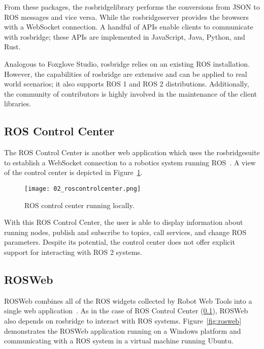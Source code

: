         From these packages, the \textsf{rosbridge\smallunderscore library} performs the conversions from \ac{JSON} to \ac{ROS} messages and vice versa. While the \textsf{rosbridge\smallunderscore server} provides the browsers with a WebSocket connection. A handful of \ac{API}s enable clients to communicate with \textsf{rosbridge}; these \ac{API}s are implemented in JavaScript, Java, Python, and Rust.

        Analogous to Foxglove Studio, \textsf{rosbridge} relies on an existing ROS installation. However, the capabilities of \textsf{rosbridge} are extensive and can be applied to real world scenarios; it also supports \ac{ROS} 1 and \ac{ROS} 2 distributions. Additionally, the community of contributors is highly involved in the maintenance of the client libraries.

    \subsection{ROS Control Center}\label{sec:roscontrolcenter}

        The \ac{ROS} Control Center is another web application which uses the \textsf{rosbridge\smallunderscore suite} to establish a WebSocket connection to a robotics system running \ac{ROS}~\cite{controlcenter}. A view of the control center is depicted in Figure~\ref{fig:roscontrolcenter}.

        \begin{figure}[htbp]
            \centering
            \texttt{[image: 02\_roscontrolcenter.png]}
            \caption{ROS control center running locally.}
            \label{fig:roscontrolcenter}
        \end{figure}

        With this \ac{ROS} Control Center, the user is able to display information about running nodes, publish and subscribe to topics, call services, and change \ac{ROS} parameters. Despite its potential, the control center does not offer explicit support for interacting with \ac{ROS} 2 systems.

    \subsection{ROSWeb}

        ROSWeb combines all of the \ac{ROS} widgets collected by Robot Web Tools into a single web application~\cite{rosweb}. As in the case of ROS Control Center (\ref{sec:roscontrolcenter}), ROSWeb also depends on \textsf{rosbridge} to interact with \ac{ROS} systems. Figure~\ref{fig:rosweb} demonstrates the ROSWeb application running on a Windows platform and communicating with a \ac{ROS} system in a virtual machine running Ubuntu.

